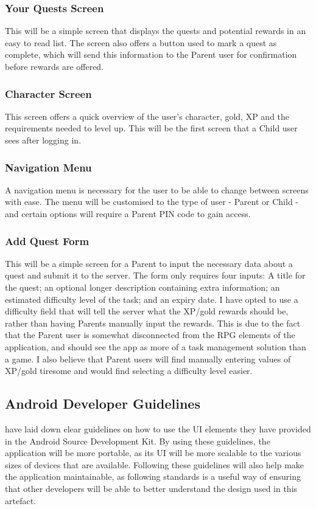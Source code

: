 \subsubsection{Your Quests Screen}
This will be a simple screen that displays the quests and potential rewards in an easy to read list.
The screen also offers a button used to mark a quest as complete, which will send this information to the Parent user for confirmation before rewards are offered.

\subsubsection{Character Screen}
This screen offers a quick overview of the user's character, gold, XP and the requirements needed to level up.
This will be the first screen that a Child user sees after logging in.

\subsubsection{Navigation Menu}
A navigation menu is necessary for the user to be able to change between screens with ease.
The menu will be customised to the type of user - Parent or Child - and certain options will require a Parent PIN code to gain access. 

\subsubsection{Add Quest Form}
This will be a simple screen for a Parent to input the necessary data about a quest and submit it to the server. 
The form only requires four inputs: A title for the quest; an optional longer description containing extra information; an estimated difficulty level of the task; and an expiry date.
I have opted to use a difficulty field that will tell the server what the XP/gold rewards should be, rather than having Parents manually input the rewards.
This is due to the fact that the Parent user is somewhat disconnected from the RPG elements of the application, and should see the app as more of a task management solution than a game.
I also believe that Parent users will find manually entering values of XP/gold tiresome and would find selecting a difficulty level easier. 

\subsection{Android Developer Guidelines}
\cite{materialdesignguidelines} have laid down clear guidelines on how to use the UI elements they have provided in the Android Source Development Kit.
By using these guidelines, the application will be more portable, as its UI will be more scalable to the various sizes of devices that are available.%
Following these guidelines will also help make the application maintainable, as following standards is a useful way of ensuring that other developers will be able to better understand the design used in this artefact.